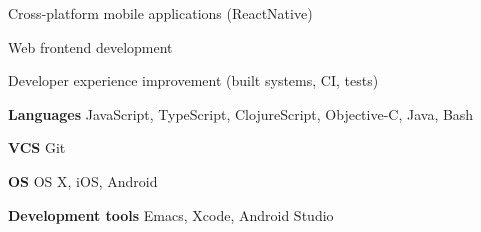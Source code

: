 \documentclass[11pt,a4paper,sans]{awesomecv}
\begin{document}
\makecvheader[C]

\let\bodyfont\cambria

\newcommand{\cvlistitem}[1]{\item {\fontsize{12pt}{1em}\bodyfont\upshape\color{darktext} #1}}
\newenvironment{cvlist}{
  \begin{description}[
      itemindent=0em,
      labelwidth=0em,
      labelsep=0em,
      leftmargin=0em,
      parsep=1ex
    ]
}{
  \end{description}
}

\newcommand{\cvdescriptionitem}[2]{\item[{\fontsize{12pt}{1em}\bodyfont\bfseries\color{darktext} #1}] {\fontsize{12pt}{1em}\cambria\upshape\color{darktext} #2}}
\newenvironment{cvdescription}{
  \begin{description}[
      parsep=1ex,
    ]
}{
  \end{description}
}

\begin{cvlist}
\cvlistitem{Cross-platform mobile applications (ReactNative)}
\cvlistitem{Web frontend development}
\cvlistitem{Developer experience improvement (built systems, CI, tests)}
\end{cvlist}

\begin{cvdescription}
\cvdescriptionitem{Languages}{JavaScript, TypeScript, ClojureScript, Objective-C, Java, Bash}
\cvdescriptionitem{VCS}{Git}
\cvdescriptionitem{OS}{OS X, iOS, Android}
\cvdescriptionitem{Development tools}{Emacs, Xcode, Android Studio}
\end{cvdescription}

\renewcommand*{\entrypositionstyle}[1]{{\fontsize{12pt}{1em}\bodyfont\bfseries\color{darktext} #1}}
\renewcommand*{\entrydatestyle}[1]{{\fontsize{11pt}{1em}\bodyfont\slshape\color{graytext} #1}}
\newcommand*{\entryemployerstyle}[1]{{\fontsize{11pt}{1em}\bodyfont\bfseries\color{graytext} #1}}
\newcommand*{\entryurlstyle}[1]{{\fontsize{11pt}{1em}\bodyfont\upshape\color{graytext} #1}}
\newcommand*{\entrydescriptionstyle}[1]{{\fontsize{12pt}{1em}\bodyfont\upshape\color{text} #1}}

\renewcommand*{\cventry}[5]{
  \setlength\tabcolsep{0pt}
  \setlength{\extrarowheight}{1ex}
  \begin{tabular*}{\textwidth}{@{\extracolsep{\fill}} l r}
    \noalign{\vspace{-2ex}}
    \entrypositionstyle{#1} & \entrydatestyle{#2} \\
    \entryemployerstyle{#3} & \entryurlstyle{\url{#4}} \\
    \multicolumn{2}{L{\textwidth}}{
      \entrydescriptionstyle{#5}
    }
  \end{tabular*}
}
\end{document}
